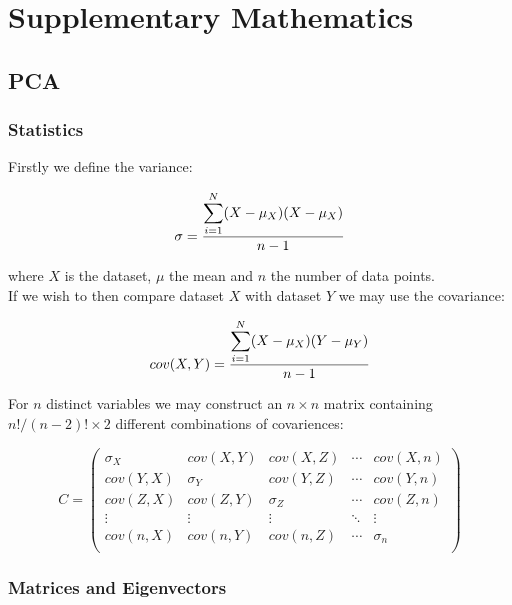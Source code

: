 

   \chapter{Supplementary Mathematics}

  \section{PCA} \label{appendix:pca}
  \subsection{Statistics}

  Firstly we define the variance:

  \begin{equation}
      \sigma = \frac{ \mathlarger{\sum}_{i=1}^{N} (X-\mu_X)(X-\mu_X)}{n-1}
  \end{equation}

  where $X$ is the dataset, $\mu$ the mean and $n$ the number of data points.\\

  If we wish to then compare dataset $X$ with dataset $Y$ we may use the covariance:

  \begin{equation}
      cov(X,Y) = \frac{ \mathlarger{\sum}_{i=1}^{N} (X-\mu_X)(Y-\mu_Y)}{n-1}
  \end{equation}

  For $n$ distinct variables we may construct an $n \times n$ matrix containing $n!/(n-2)!\times 2$ different combinations of covariences:



  \[
  C=
    \begin{pmatrix}
      \sigma_X & cov(X,Y) & cov(X,Z)& \cdots & cov(X,n) \\
      cov(Y,X) & \sigma_Y & cov(Y,Z)& \cdots & cov(Y,n) \\
      cov(Z,X)& cov(Z,Y) & \sigma_Z& \cdots & cov(Z,n) \\
      \vdots & \vdots & \vdots & \ddots & \vdots \\
      cov(n,X) & cov(n,Y) & cov(n,Z)& \cdots & \sigma_n \\
    \end{pmatrix}
  \]

  \subsection{Matrices and Eigenvectors}

